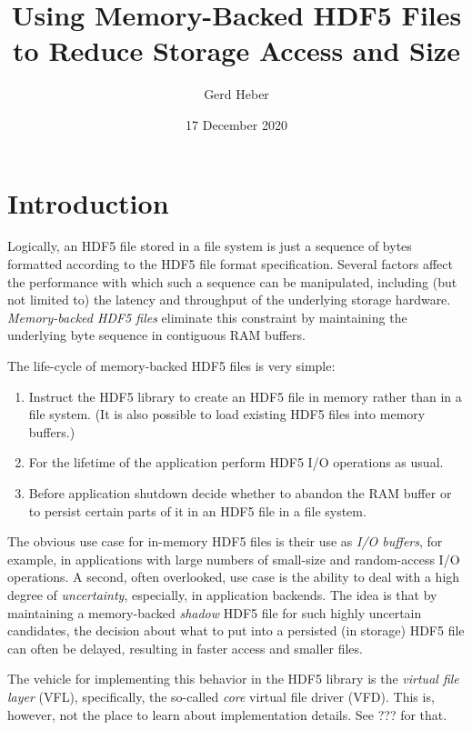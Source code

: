 \documentclass[a4paper, 12pt]{article}
\author{Gerd Heber}
\date{17 December 2020}
\title{Using Memory-Backed HDF5 Files to Reduce Storage Access and Size}
\begin{document}
\maketitle
\tableofcontents


\section{Introduction}
\label{sec:org2438f7c}

Logically, an HDF5 file stored in a file system is just a sequence of bytes
formatted according to the HDF5 file format specification. Several factors
affect the performance with which such a sequence can be manipulated,
including (but not limited to) the latency and throughput of the underlying
storage hardware. \emph{Memory-backed HDF5 files} eliminate this constraint by
maintaining the underlying byte sequence in contiguous RAM buffers.

The life-cycle of memory-backed HDF5 files is very simple:

\begin{enumerate}
\item Instruct the HDF5 library to create an HDF5 file in memory rather than in
a file system. (It is also possible to load existing HDF5 files into
memory buffers.)
\item For the lifetime of the application perform HDF5 I/O operations as usual.
\item Before application shutdown decide whether to abandon the RAM buffer or to
persist certain parts of it in an HDF5 file in a file system.
\end{enumerate}

The obvious use case for in-memory HDF5 files is their use as \emph{I/O buffers},
for example, in applications with large numbers of small-size and
random-access I/O operations. A second, often overlooked, use case is the
ability to deal with a high degree of \emph{uncertainty}, especially, in
application backends. The idea is that by maintaining a memory-backed
\emph{shadow} HDF5 file for such highly uncertain candidates, the decision about
what to put into a persisted (in storage) HDF5 file can often be delayed,
resulting in faster access and smaller files.

The vehicle for implementing this behavior in the HDF5 library is the
\emph{virtual file layer} (VFL), specifically, the so-called \emph{core} virtual file
driver (VFD).  This is, however, not the place to learn about implementation
details. See ??? for that.
\end{document}
